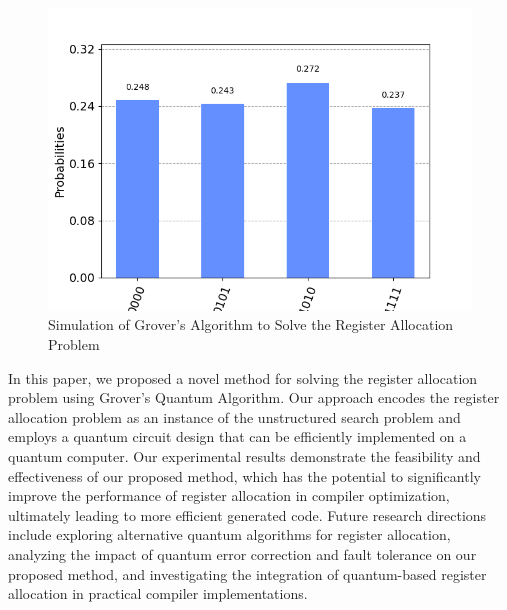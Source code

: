 \begin{figure}[htp]
    \centering
    \includegraphics[width=18cm]{Figures/Register_Allocation_hist.png}
    \caption{Simulation of Grover's Algorithm to Solve the Register Allocation Problem}
    \label{hist:Register_Allocation}
\end{figure}

In this paper, we proposed a novel method for solving the register allocation problem using Grover's Quantum Algorithm. Our approach encodes the register allocation problem as an instance of the unstructured search problem and employs a quantum circuit design that can be efficiently implemented on a quantum computer. Our experimental results demonstrate the feasibility and effectiveness of our proposed method, which has the potential to significantly improve the performance of register allocation in compiler optimization, ultimately leading to more efficient generated code. Future research directions include exploring alternative quantum algorithms for register allocation, analyzing the impact of quantum error correction and fault tolerance on our proposed method, and investigating the integration of quantum-based register allocation in practical compiler implementations.

